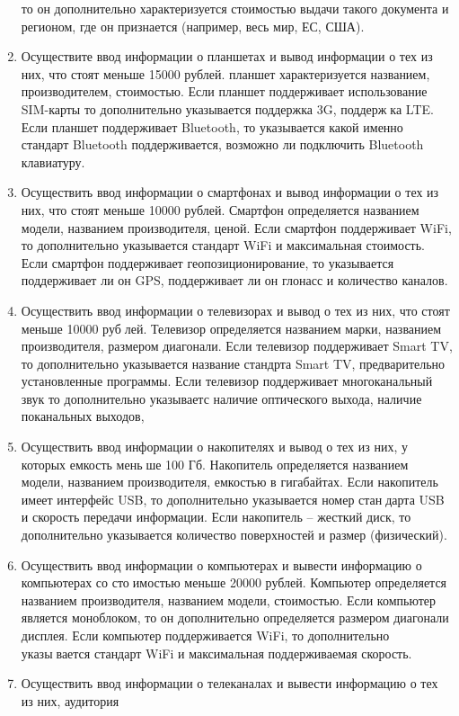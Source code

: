 \begin{enumerate}
то он дополнительно характеризуется стоимостью выдачи такого документа и регионом, где он
признается (например, весь мир, ЕС, США).
\item Осуществите ввод информации о планшетах и вывод информации о тех из них, что стоят меньше
15000 рублей. планшет характеризуется названием, производителем, стоимостью. Если планшет
поддерживает использование SIM-карты то дополнительно указывается поддержка 3G, поддержка LTE. Если планшет поддерживает Bluetooth, то указывается какой именно стандарт Bluetooth
поддерживается, возможно ли подключить Bluetooth клавиатуру.
\item Осуществить ввод информации о смартфонах и вывод информации о тех из них, что стоят меньше
10000 рублей. Смартфон определяется названием модели, названием производителя, ценой. Если
смартфон поддерживает WiFi, то дополнительно указывается стандарт WiFi и максимальная
стоимость. Если смартфон поддерживает геопозиционирование, то указывается поддерживает
ли он GPS, поддерживает ли он глонасс и количество каналов.
\item Осуществить ввод информации о телевизорах и вывод о тех из них, что стоят меньше 10000 рублей. Телевизор определяется названием марки, названием производителя, размером диагонали.
Если телевизор поддерживает Smart TV, то дополнительно указывается название стандрта Smart
TV, предварительно установленные программы. Если телевизор поддерживает многоканальный
звук то дополнительно указываетс наличие оптического выхода, наличие поканальных выходов,
\item Осуществить ввод информации о накопителях и вывод о тех из них, у которых емкость меньше 100 Гб. Накопитель определяется названием модели, названием производителя, емкостью в
гигабайтах. Если накопитель имеет интерфейс USB, то дополнительно указывается номер стандарта USB и скорость передачи информации. Если накопитель – жесткий диск, то дополнительно
указывается количество поверхностей и размер (физический).
\item Осуществить ввод информации о компьютерах и вывести информацию о компьютерах со стоимостью меньше 20000 рублей. Компьютер определяется названием производителя, названием
модели, стоимостью. Если компьютер является моноблоком, то он дополнительно определяется
размером диагонали дисплея. Если компьютер поддерживается WiFi, то дополнительно указывается стандарт WiFi и максимальная поддерживаемая скорость.
\item Осуществить ввод информации о телеканалах и вывести информацию о тех из них, аудитория

\end{enumerate}
